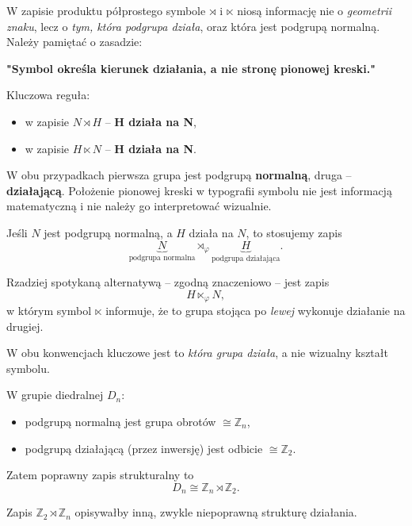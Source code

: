 \begin{remark}
W zapisie produktu półprostego symbole $\rtimes$ i $\ltimes$ niosą informację 
nie o \emph{geometrii znaku}, lecz o \emph{tym, która podgrupa działa}, oraz która 
jest podgrupą normalną. Należy pamiętać o zasadzie:

\begin{center}
\textbf{"Symbol określa kierunek działania, a nie stronę pionowej kreski."}
\end{center}

Kluczowa reguła:
\begin{itemize}
    \item w zapisie $N \rtimes H$ – \textbf{H działa na N},
    \item w zapisie $H \ltimes N$ – \textbf{H działa na N}.
\end{itemize}

W obu przypadkach pierwsza grupa jest podgrupą \textbf{normalną}, druga – 
\textbf{działającą}. Położenie pionowej kreski w typografii symbolu nie jest
informacją matematyczną i nie należy go interpretować wizualnie.
\end{remark}

\begin{definition}
Jeśli $N$ jest podgrupą normalną, a $H$ działa na $N$, to stosujemy zapis
\[
    \underbrace{N}_{\text{podgrupa normalna}}
    \rtimes_\varphi
    \underbrace{H}_{\text{podgrupa działająca}}.
\]

Rzadziej spotykaną alternatywą – zgodną znaczeniowo – jest zapis
\[
    H \ltimes_\varphi N,
\]
w którym symbol $\ltimes$ informuje, że to grupa stojąca po \emph{lewej}
wykonuje działanie na drugiej.

W obu konwencjach kluczowe jest to \emph{która grupa działa}, a nie wizualny
kształt symbolu.
\end{definition}

\begin{eg}[Zastosowanie w $D_n$]
W grupie diedralnej $D_n$:
\begin{itemize}
    \item podgrupą normalną jest grupa obrotów $\cong \mathbb{Z}_n$,
    \item podgrupą działającą (przez inwersję) jest odbicie $\cong \mathbb{Z}_2$.
\end{itemize}

Zatem poprawny zapis strukturalny to
\[
    D_n \cong \mathbb{Z}_n \rtimes \mathbb{Z}_2.
\]

Zapis $\mathbb{Z}_2 \rtimes \mathbb{Z}_n$ opisywałby inną, zwykle niepoprawną
strukturę działania.
\end{eg}

